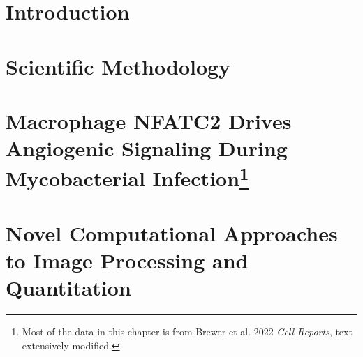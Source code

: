 \documentclass[PhD]{dukethesis2006}
\begin{document}
\tableofcontents


\chapter{Introduction}\label{intro}


\begin{doublespace}

\end{doublespace}

\chapter{Scientific Methodology}\label{methods}

\begin{doublespace}

\end{doublespace}

\chapter[Macrophage NFATC2 Drives Angiogenic Signaling During Mycobacterial Infection]{Macrophage NFATC2 Drives Angiogenic Signaling During Mycobacterial Infection\footnote{Most of the data in this chapter is from Brewer et al. 2022 \textit{Cell Reports}, text extensively modified.}}\label{chap3}

\begin{doublespace}

\end{doublespace}

\chapter{Novel Computational Approaches to Image Processing and Quantitation}\label{chap4}
\end{document}

